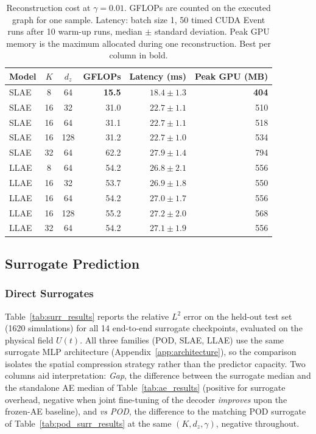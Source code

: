 ﻿\documentclass[a4paper,12pt]{article}
\theoremstyle{definition}
\theoremstyle{remark}
\begin{document}
\begin{table}[htbp]
    \centering
    \renewcommand{\arraystretch}{1.3}
    \begin{tabular}{lccrrr}
        \toprule
        \textbf{Model} & $K$ & $d_z$ & \textbf{GFLOPs} & \textbf{Latency (ms)} & \textbf{Peak GPU (MB)} \\
        \midrule
        SLAE & 8  & 64  & \textbf{15.5} & $\mathbf{18.4 \pm 1.3}$ & \textbf{404} \\
        SLAE & 16 & 32  & 31.0 & $22.7 \pm 1.1$ & 510 \\
        SLAE & 16 & 64  & 31.1 & $22.7 \pm 1.1$ & 518 \\
        SLAE & 16 & 128 & 31.2 & $22.7 \pm 1.0$ & 534 \\
        SLAE & 32 & 64  & 62.2 & $27.9 \pm 1.4$ & 794 \\
        \midrule
        LLAE & 8  & 64  & 54.2 & $26.8 \pm 2.1$ & 556 \\
        LLAE & 16 & 32  & 53.7 & $26.9 \pm 1.8$ & 550 \\
        LLAE & 16 & 64  & 54.2 & $27.0 \pm 1.7$ & 556 \\
        LLAE & 16 & 128 & 55.2 & $27.2 \pm 2.0$ & 568 \\
        LLAE & 32 & 64  & 54.2 & $27.1 \pm 1.9$ & 556 \\
        \bottomrule
    \end{tabular}
    \caption{Reconstruction cost at $\gamma = 0.01$. GFLOPs are counted on the executed graph for one sample. Latency: batch size 1, 50 timed CUDA Event runs after 10 warm-up runs, median $\pm$ standard deviation. Peak GPU memory is the maximum allocated during one reconstruction. Best per column in bold.}
    \label{tab:bench}
\end{table}


\subsection{Surrogate Prediction}
\label{sec:surr_results}

\subsubsection{Direct Surrogates}
\label{sec:direct_surr}

Table~\ref{tab:surr_results} reports the relative $L^2$ error on the held-out test set (1620 simulations) for all 14 end-to-end surrogate checkpoints, evaluated on the physical field $U(t)$. All three families (POD, SLAE, LLAE) use the same surrogate MLP architecture (Appendix~\ref{app:architecture}), so the comparison isolates the spatial compression strategy rather than the predictor capacity. Two columns aid interpretation: \emph{Gap}, the difference between the surrogate median and the standalone AE median of Table~\ref{tab:ae_results} (positive for surrogate overhead, negative when joint fine-tuning of the decoder \emph{improves} upon the frozen-AE baseline), and \emph{vs POD}, the difference to the matching POD surrogate of Table~\ref{tab:pod_surr_results} at the same $(K, d_z, \gamma)$, negative throughout.
\end{document}
